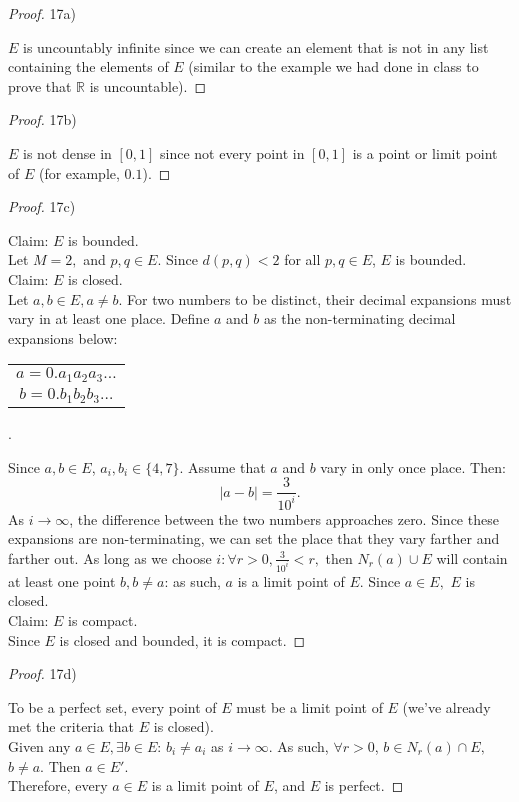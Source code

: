 \documentclass[10pt]{article}
\theoremstyle{definition}
\theoremstyle{plain}
\newcommand{\R}{\mathbb{R}}
\begin{document}
\begin{proof}
17a)

$E$ is uncountably infinite since we can create an element that is not in any list containing the elements of $E$ (similar to the example we had done in class to prove that $\R$ is uncountable).
\end{proof}

\begin{proof}
17b)

$E$ is not dense in $[0,1]$ since not every point in $[0,1]$ is a point or limit point of $E$ (for example, $0.1$).
\end{proof}

\begin{proof}
17c)

Claim: $E$ is bounded. \\
Let $M=2,$ and $p,q\in E.$ Since $d(p,q)<2$ for all $p,q\in E$, $E$ is bounded. \\

Claim: $E$ is closed. \\
Let $a,b\in E, a\neq b$. For two numbers to be distinct, their decimal expansions must vary in at least one place. Define $a$ and $b$ as the non-terminating decimal expansions below:
\begin{center}
\begin{tabular}{c}
$a = 0.a_1a_2a_3\dots$ \\
$b = 0.b_1b_2b_3\dots$
\end{tabular}.
\end{center}
Since $a,b\in E$, $a_i,b_i\in\{4,7\}.$ Assume that $a$ and $b$ vary in only once place. Then:
$$|a-b| = \frac{3}{10^i}.$$
As $i\rightarrow\infty$, the difference between the two numbers approaches zero. Since these expansions are non-terminating, we can set the place that they vary farther and farther out. As long as we choose $i:\forall r>0, \frac{3}{10^i} < r,$ then $N_r(a)\cup E$ will contain at least one point $b, b\neq a$: as such, $a$ is a limit point of $E$.
Since $a\in E,$ $E$ is closed. \\

Claim: $E$ is compact. \\

Since $E$ is closed and bounded, it is compact.
\end{proof}

\begin{proof}
17d)

To be a perfect set, every point of $E$ must be a limit point of $E$ (we've already met the criteria that $E$ is closed). \\

Given any $a\in E,\exists b\in E$: $b_i\neq a_i$ as $i\rightarrow\infty$. As such, $\forall r>0$, $b\in N_r(a)\cap E,$ $b\neq a$. Then $a\in E'$. \\

Therefore, every $a\in E$ is a limit point of $E$, and $E$ is perfect.
\end{proof}
\end{document}
